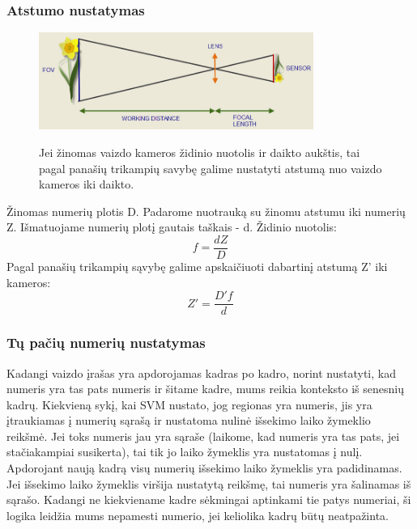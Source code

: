 \documentclass[a4paper,12pt]{article}
\begin{document}
\subsubsection{Atstumo nustatymas}
\begin{figure}[h!]
  \caption{Jei žinomas vaizdo kameros židinio nuotolis ir daikto aukštis, tai pagal panašių trikampių savybę galime nustatyti atstumą nuo vaizdo kameros iki daikto.}
  \centering
    \includegraphics[width=0.8\textwidth]{lens.jpg}
  \label{fig:Lens}
\end{figure}

Žinomas numerių plotis D. Padarome nuotrauką su žinomu atstumu iki numerių Z. Išmatuojame numerių plotį gautais taškais - d. 
Židinio nuotolis:
\begin{equation}
 f =\frac{d Z}{D}
\end{equation}
Pagal panašių trikampių sąvybę galime apskaičiuoti dabartinį atstumą Z' iki kameros:
\begin{equation}
Z'= \frac{D' f}{d}
\end{equation}


\subsubsection{Tų pačių numerių nustatymas}
Kadangi vaizdo įrašas yra apdorojamas kadras po kadro, norint nustatyti, kad numeris yra tas pats numeris ir šitame kadre, mums reikia konteksto iš senesnių kadrų. Kiekvieną sykį, kai SVM nustato, jog regionas yra numeris, jis yra įtraukiamas į numerių sąrašą ir nustatoma nulinė išsekimo laiko žymeklio reikšmė. Jei toks numeris jau yra sąraše (laikome, kad numeris yra tas pats, jei stačiakampiai susikerta), tai tik jo laiko žymeklis yra nustatomas į nulį. Apdorojant naują kadrą visų numerių išsekimo laiko žymeklis yra padidinamas. Jei išsekimo laiko žymeklis viršija nustatytą reikšmę, tai numeris yra šalinamas iš sąrašo. Kadangi ne kiekviename kadre sėkmingai aptinkami tie patys numeriai, ši logika leidžia mums nepamesti numerio, jei keliolika kadrų būtų neatpažinta.
\end{document}
